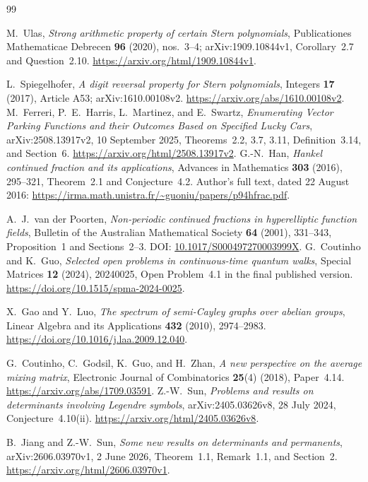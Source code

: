 \documentclass[11pt,a4paper]{article}
\theoremstyle{definition}
\theoremstyle{remark}
\begin{document}
\begin{thebibliography}{99}
\raggedright
{}
M.~Ulas, \emph{Strong arithmetic property of certain Stern polynomials},
Publicationes Mathematicae Debrecen \textbf{96} (2020), nos.~3--4;
arXiv:1909.10844v1, Corollary~2.7 and Question~2.10.
\url{https://arxiv.org/html/1909.10844v1}.

L.~Spiegelhofer, \emph{A digit reversal property for Stern polynomials},
Integers \textbf{17} (2017), Article A53; arXiv:1610.00108v2.
\url{https://arxiv.org/abs/1610.00108v2}.
M.~Ferreri, P.~E.~Harris, L.~Martinez, and E.~Swartz,
\emph{Enumerating Vector Parking Functions and their Outcomes Based on
Specified Lucky Cars}, arXiv:2508.13917v2, 10 September 2025,
Theorems~2.2, 3.7, 3.11, Definition~3.14, and Section~6.
\url{https://arxiv.org/html/2508.13917v2}.
G.-N.~Han, \emph{Hankel continued fraction and its applications},
Advances in Mathematics \textbf{303} (2016), 295--321,
Theorem~2.1 and Conjecture~4.2.
Author's full text, dated 22 August 2016:
\url{https://irma.math.unistra.fr/~guoniu/papers/p94hfrac.pdf}.

A.~J.~van der Poorten, \emph{Non-periodic continued fractions in
hyperelliptic function fields}, Bulletin of the Australian Mathematical
Society \textbf{64} (2001), 331--343, Proposition~1 and Sections~2--3.
DOI: \href{https://doi.org/10.1017/S000497270003999X}{10.1017/S000497270003999X}.
G.~Coutinho and K.~Guo, \emph{Selected open problems in continuous-time
quantum walks}, Special Matrices \textbf{12} (2024), 20240025,
Open Problem~4.1 in the final published version.
\url{https://doi.org/10.1515/spma-2024-0025}.

X.~Gao and Y.~Luo, \emph{The spectrum of semi-Cayley graphs over abelian
groups}, Linear Algebra and its Applications \textbf{432} (2010),
2974--2983. \url{https://doi.org/10.1016/j.laa.2009.12.040}.

G.~Coutinho, C.~Godsil, K.~Guo, and H.~Zhan,
\emph{A new perspective on the average mixing matrix},
Electronic Journal of Combinatorics \textbf{25}(4) (2018), Paper~4.14.
\url{https://arxiv.org/abs/1709.03591}.
Z.-W.~Sun, \emph{Problems and results on determinants involving Legendre
symbols}, arXiv:2405.03626v8, 28 July 2024, Conjecture~4.10(ii).
\url{https://arxiv.org/html/2405.03626v8}.

B.~Jiang and Z.-W.~Sun, \emph{Some new results on determinants and
permanents}, arXiv:2606.03970v1, 2 June 2026, Theorem~1.1,
Remark~1.1, and Section~2.
\url{https://arxiv.org/html/2606.03970v1}.

\end{thebibliography}
\end{document}
